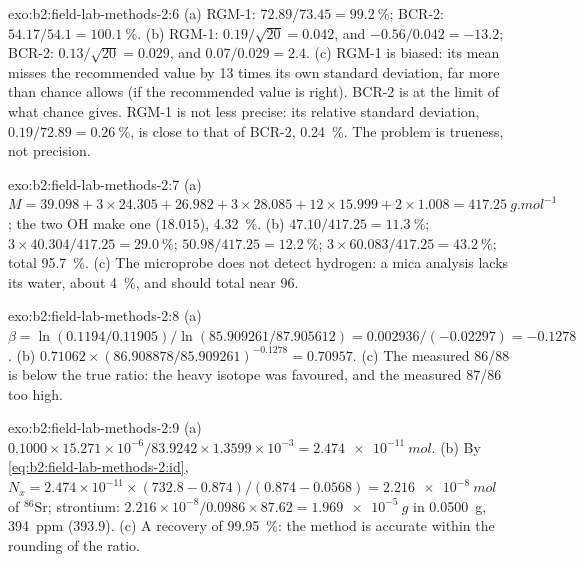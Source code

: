 \begin{solution}{exo:b2:field-lab-methods-2:6}
(a) RGM-1: $72.89/73.45 = \qty{99.2}{\percent}$; BCR-2: $54.17/54.1 = \qty{100.1}{\percent}$.
(b) RGM-1: $0.19/\sqrt{20} = 0.042$, and $-0.56/0.042 = -13.2$; BCR-2: $0.13/\sqrt{20} = 0.029$, and
$0.07/0.029 = 2.4$. (c) RGM-1 is biased: its mean misses the recommended value by 13 times its own
standard deviation, far more than chance allows (if the recommended value is right). BCR-2 is at
the limit of what chance gives. RGM-1 is not less precise: its relative standard deviation,
$0.19/72.89 = \qty{0.26}{\percent}$, is close to that of BCR-2, \qty{0.24}{\percent}. The problem is
trueness, not precision.
\end{solution}

\begin{solution}{exo:b2:field-lab-methods-2:7}
(a) $M = 39.098 + 3 \times 24.305 + 26.982 + 3 \times 28.085 + 12 \times 15.999 + 2 \times 1.008 =
\qty{417.25}{g.mol^{-1}}$; the two OH make one  ($18.015$), \qty{4.32}{\percent}.
(b)  $47.10/417.25 = \qty{11.3}{\percent}$;  $3 \times 40.304/417.25 =
\qty{29.0}{\percent}$;  $50.98/417.25 = \qty{12.2}{\percent}$;  $3 \times
60.083/417.25 = \qty{43.2}{\percent}$; total \qty{95.7}{\percent}. (c) The microprobe does not
detect hydrogen: a mica analysis lacks its water, about \qty{4}{\percent}, and should total near
96.
\end{solution}

\begin{solution}{exo:b2:field-lab-methods-2:8}
(a) $\beta = \ln(0.1194/0.11905)/\ln(85.909261/87.905612) = 0.002936/(-0.02297) = -0.1278$.
(b) $0.71062 \times (86.908878/85.909261)^{-0.1278} = 0.70957$. (c) The measured 86/88 is below the
true ratio: the heavy isotope was favoured, and the measured 87/86 too high.
\end{solution}

\begin{solution}{exo:b2:field-lab-methods-2:9}
(a) $0.1000 \times 15.271 \times 10^{-6}/83.9242 \times 1.3599 \times 10^{-3} = \qty{2.474e-11}{mol}$.
(b) By \eqref{eq:b2:field-lab-methods-2:id}, $N_x = 2.474 \times 10^{-11} \times (732.8 -
0.874)/(0.874 - 0.0568) = \qty{2.216e-8}{mol}$ of $^{86}\mathrm{Sr}$; strontium: $2.216 \times
10^{-8}/0.0986 \times 87.62 = \qty{1.969e-5}{g}$ in \qty{0.0500}{g}, \qty{394}{ppm} (393.9).
(c) A recovery of \qty{99.95}{\percent}: the method is accurate within the rounding of the ratio.
\end{solution}

